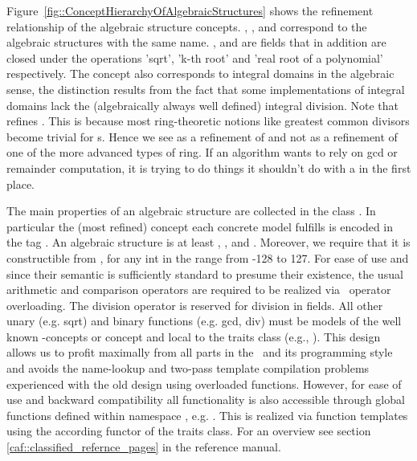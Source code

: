 Figure~\ref{fig::ConceptHierarchyOfAlgebraicStructures} shows the refinement 
relationship of the algebraic structure concepts. 
, ,   and 
 correspond to the algebraic structures with the
same name. ,  and 
 are fields that in addition are closed under 
the operations 'sqrt', 'k-th root' and 'real root of a polynomial' 
respectively. The concept  also
corresponds to integral domains in the algebraic sense, the
distinction results from the fact that some implementations of
integral domains lack the (algebraically always well defined) integral 
division.
Note that  refines . This is because 
most ring-theoretic notions like greatest common divisors become trivial for 
s. Hence we see  as a refinement of 
 and not as a 
refinement of one of the more advanced types of ring. 
If an algorithm wants to rely on gcd or remainder computation, it is trying 
to do things it shouldn't do with a  in the first place. 


The main properties of an algebraic structure are collected in the class   
. 
In particular the (most refined) concept each concrete model  
fulfills is encoded in the tag 
.
An algebraic structure is at least , 
,  and 
. Moreover, we require that it is
constructible from , for any int in the range from -128 to 127. 
For ease of use and since their semantic is sufficiently standard to presume 
their existence, the usual arithmetic and comparison operators are required
to be realized via \CC\ operator overloading. 
The division operator is reserved for division in fields.  
All other unary (e.g. sqrt) and binary functions 
(e.g. gcd, div) must be models of the well known \stl-concepts
 or 
concept and local to the traits class 
(e.g., ). 
This design allows us to profit maximally from all parts in the 
\stl\ and its programming style and avoids the name-lookup and 
two-pass template compilation problems experienced with the old design 
using overloaded functions. However, for ease of use and backward 
compatibility all functionality is also 
accessible through global functions defined within namespace , 
e.g. . This is realized via function templates using 
the according functor of the traits class. For an overview see section  
\ref{caf::classified_refernce_pages} in the reference manual.

